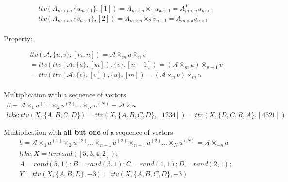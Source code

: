 \documentclass{Note}
\begin{document}
\begin{equation}
\begin{aligned}
ttv(A_{m\times n},\{u_{m\times 1}\},[1])=A_{m\times n}\bar{\times}_1 u_{m\times 1}=A_{m\times n}^T u_{m\times 1}\\
ttv(A_{m\times n},\{v_{n\times 1}\},[2])=A_{m\times n}\bar{\times}_2 v_{n\times 1}=A_{m\times n}  v_{n\times 1}\\
\end{aligned}
\end{equation}

Property:

\begin{equation}
\begin{aligned}
ttv(\mathcal{A},\{u,v\},[m,n])=\mathcal{A}\bar{\times}_m u \bar{\times}_n v\\
=ttv(ttv(\mathcal{A},\{u\},[m]),\{v\},[n-1])=(\mathcal{A}\bar{\times}_m u ) \bar{\times}_{n-1} v\\
=ttv(ttv(\mathcal{A},\{v\},[v]),\{u\},[m])=(\mathcal{A}\bar{\times}_n v ) \bar{\times}_{m} u\\
\end{aligned}
\end{equation}

Multiplication with a sequence of vectors
\begin{equation}
\begin{aligned}
\beta=\mathcal{A}\bar{\times}_1 u^{(1)}\bar{\times}_2 u^{(2)}...\bar{\times}_N u^{(N)}=\mathcal{A}\bar{\times} {u}\\
like:
ttv(X, \{A,B,C,D\})
= ttv(X, \{A,B,C,D\}, [1 2 3 4]) 
= ttv(X, \{D,C,B,A\}, [4 3 2 1])
\end{aligned}
\end{equation}

Multiplication with \textbf{all but one} of a sequence of vectors
\begin{equation}
\begin{aligned}
b=\mathcal{A}\bar{\times}_1 u^{(1)}\bar{\times}_2 u^{(2)}...\bar{\times}_{n-1} u^{(2)}\bar{\times}_{n+1} u^{(2)}...\bar{\times}_N u^{(N)}=\mathcal{A}\bar{\times}_{-n} {u}\\
like:
X = tenrand([5,3,4,2]); \\
A = rand(5,1); B = rand(3,1); C = rand(4,1); D = rand(2,1); \\
Y = ttv(X, \{A,B,D\}, -3) = ttv(X, \{A,B,C,D\}, -3)
\end{aligned}
\end{equation}
\end{document}
